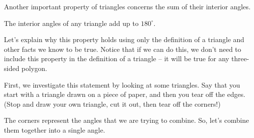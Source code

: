 \documentclass{ximera}
\begin{document}
Another important property of triangles concerns the sum of their interior angles.

\begin{theorem}
The interior angles of any triangle add up to $180^{\circ}$.
\end{theorem}

Let's explain why this property holds using only the definition of a triangle and other facts we know to be true. Notice that if we can do this, we don't need to include this property in the definition of a triangle -- it will be true for any three-sided polygon.

First, we investigate this statement by looking at some triangles. Say that you start with a triangle drawn on a piece of paper, and then you tear off the edges. (Stop and draw your own triangle, cut it out, then tear off the corners!)
\begin{image}

\end{image}

The corners represent the angles that we are trying to combine. So, let's combine them together into a single angle.
\begin{image}
\end{image}
\end{document}
